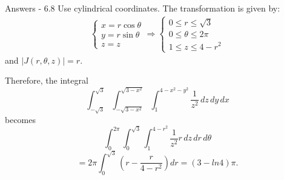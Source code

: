 \documentclass[aspectratio=169, UTF8]{beamer}
\begin{document}
\begin{frame}{Answers - 6.8}
    Use cylindrical coordinates. The transformation is given by:
    \begin{align*}
        \begin{cases}
            x = r \cos \theta \\
            y = r \sin \theta \\
            z = z
        \end{cases}
        \Rightarrow
        \begin{cases}
            0 \leq r \leq \sqrt{3}  \\
            0 \leq \theta \leq 2\pi \\
            1 \leq z \leq 4 - r^2
        \end{cases}
    \end{align*}
    and $|J(r, \theta, z)| = r$.

    Therefore, the integral
    \[
        \int_{-\sqrt{3}}^{\sqrt{3}} \int_{-\sqrt{3-x^2}}^{\sqrt{3-x^2}} \int_{1}^{4-x^2-y^2} \frac{1}{z^2} \, dz \, dy \, dx
    \]
    becomes
    \[
        \int_{0}^{2\pi} \int_{0}^{\sqrt{3}} \int_{1}^{4-r^2} \frac{1}{z^2} r \, dz \, dr \, d\theta
    \]
    \[
        = 2\pi \int_{0}^{\sqrt{3}} \left( r - \frac{r}{4 - r^2} \right) dr =(3-ln 4) \pi.
    \]
\end{frame}

\end{document}
